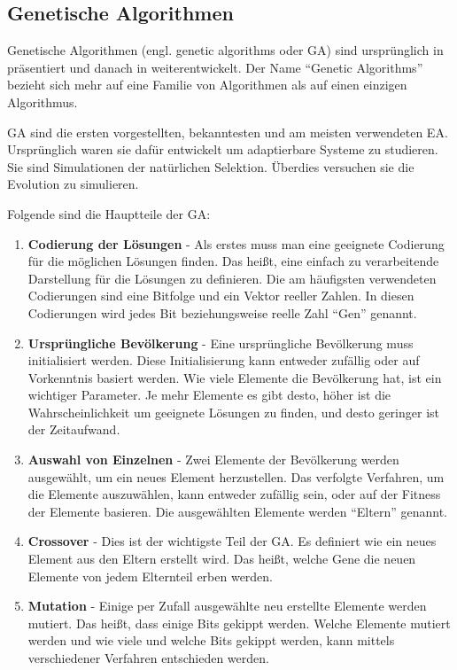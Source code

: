 \documentclass[twoside,twocolumn]{article}
\begin{document}
\subsection{Genetische Algorithmen}
Genetische Algorithmen (engl. genetic algorithms oder GA) sind ursprünglich in \cite{holland_ga} präsentiert und danach in \cite{goldberg_ga} weiterentwickelt. Der Name \enquote{Genetic Algorithms} bezieht sich mehr auf eine Familie von Algorithmen als auf einen einzigen Algorithmus.\par
GA sind die ersten vorgestellten, bekanntesten und am meisten verwendeten EA. Ursprünglich waren sie dafür entwickelt um adaptierbare Systeme zu studieren. Sie sind Simulationen der natürlichen Selektion. Überdies versuchen sie die Evolution zu simulieren.\par
Folgende sind die Hauptteile der GA:

\begin{enumerate}
\item{\textbf{Codierung der Lösungen} - Als erstes muss man eine geeignete Codierung für die möglichen Lösungen finden. Das heißt, eine einfach zu verarbeitende Darstellung für die Lösungen zu definieren. Die am häufigsten verwendeten Codierungen sind eine Bitfolge und ein Vektor reeller Zahlen. In diesen Codierungen wird jedes Bit beziehungsweise reelle Zahl \enquote{Gen} genannt.}
\item{\textbf{Ursprüngliche Bevölkerung} - Eine ursprüngliche Bevölkerung muss initialisiert werden. Diese Initialisierung kann entweder zufällig oder auf Vorkenntnis basiert werden. Wie viele Elemente die Bevölkerung hat, ist ein wichtiger Parameter. Je mehr Elemente es gibt desto, höher ist die Wahrscheinlichkeit um geeignete Lösungen zu finden, und desto geringer ist der Zeitaufwand.}
\item{\textbf{Auswahl von Einzelnen} - Zwei Elemente der Bevölkerung werden ausgewählt, um ein neues Element herzustellen. Das verfolgte Verfahren, um die Elemente auszuwählen, kann entweder zufällig sein, oder auf der Fitness der Elemente basieren. Die ausgewählten Elemente werden \enquote{Eltern} genannt.}
\item{\textbf{Crossover} - Dies ist der wichtigste Teil der GA. Es definiert wie ein neues Element aus den Eltern erstellt wird. Das heißt, welche Gene die neuen Elemente von jedem Elternteil erben werden.}
\item{\textbf{Mutation} - Einige per Zufall ausgewählte neu erstellte Elemente werden mutiert. Das heißt, dass einige Bits gekippt werden. Welche Elemente mutiert werden und wie viele und welche Bits gekippt werden, kann mittels verschiedener Verfahren entschieden werden.}
\end{enumerate}
\end{document}
